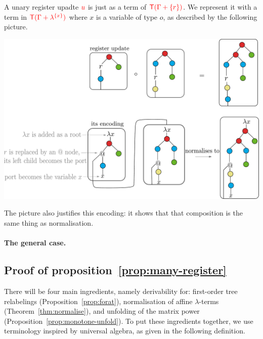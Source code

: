 A unary register upadte ${\color{red}{u}}$ is just as a term of ${\color{red}{{\color{red}{\mathsf T}}(\Gamma+\{r\})}}$.  We represent it with a term in ${\color{red}{{\color{red}{\mathsf T}}(\Gamma+\lambda^{\{x\}})}}$ where $x$ is a variable of type $o$, as described by the following picture.
 \begin{center}
\includegraphics[scale=.26]{composition=normalisation.pdf}
\end{center}
The picture also justifies this encoding: it shows that that composition is the same thing as normalisation.

\paragraph{The general case.}

\subsection{Proof of proposition~\ref{prop:many-register}}\label{subsec:proof}

There will be four main ingredients, namely derivability for: first-order tree relabelings (Proposition~\ref{prop:forat}), normalisation of affine $\lambda$-terms (Theorem~\ref{thm:normalise}), and unfolding of the matrix power (Proposition~\ref{prop:monotone-unfold}).
\label{sec:proof-of-prop} 
To put these ingredients together,  we use  terminology inspired by universal algebra, as given in the following definition. 

